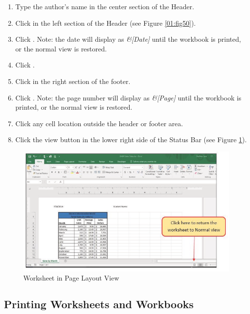 \begin{enumbox}
	\begin{enumerate}
		\item Type the author's name in the center section of the Header.
		\item Click in the left section of the Header (see Figure \ref{01:fig50}).
		\item Click . Note: the date will display as \textit{\&[Date]} until the workbook is printed, or the normal view is restored.
		\item Click .
		\item Click in the right section of the footer.
		\item Click . Note: the page number will display as \textit{\&[Page]} until the workbook is printed, or the normal view is restored.
		\item Click any cell location outside the header or footer area.
		\item Click the  view button in the lower right side of the Status Bar (see Figure \ref{01:fig51}).
	\end{enumerate}
\end{enumbox}

\begin{figure}[H]
	\centering
	\includegraphics[width=\maxwidth{.95\linewidth}]{gfx/ch01_fig51}
	\caption{Worksheet in Page Layout View}
	\label{01:fig51}
\end{figure}

\subsection{Printing Worksheets and Workbooks}

